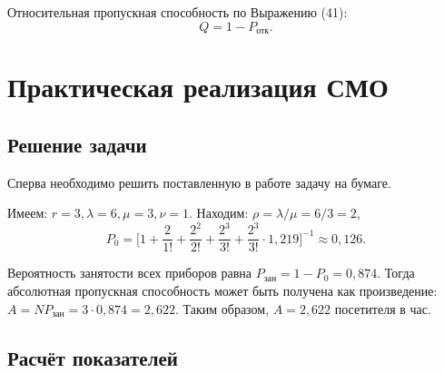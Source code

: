 \documentclass[14pt]{extarticle}
\begin{document}
    Относительная пропускная способность по Выражению (41):
    \begin{equation}
        Q = 1 - P_\text{отк}.
    \end{equation}

    \newpage
    \section{Практическая реализация СМО}

    \subsection{Решение задачи}

    Сперва необходимо решить поставленную в работе задачу на бумаге.

    Имеем: $ r = 3, \lambda = 6, \mu = 3, \nu = 1 $. Находим: $ \rho = \lambda / \mu = 6 / 3 = 2$,
    $$ P_0 = \Bigg[ 1 + \frac{2}{1!} + \frac{2^2}{2!} + \frac{2^3}{3!} + \frac{2^3}{3!} \cdot 1,219 \Bigg]^{-1} \approx 0,126. $$

    Вероятность занятости всех приборов равна $P_\text{зан} = 1 - P_0 = 0,874$. Тогда абсолютная пропускная способность может быть получена как произведение: $ A = NP_\text{зан} = 3 \cdot 0,874 = 2,622 $. Таким образом, $ A =  2,622 $ посетителя в час.

    \subsection{Расчёт показателей}
\end{document}
